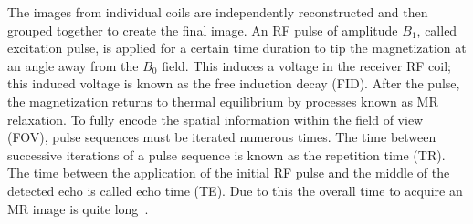 The images from individual coils are independently reconstructed and then grouped together to create the final image. An RF pulse of amplitude $B_1$, called excitation pulse, is applied for a certain time duration to tip the magnetization at an angle away from the $B_0$ field. This induces a voltage in the receiver RF coil; this induced voltage is known as the free induction decay (FID). After the pulse, the magnetization returns to thermal equilibrium by processes known as MR relaxation. To fully encode the spatial information within the field of view (FOV), pulse sequences must be iterated numerous times. The time between successive iterations of a pulse sequence is known as the repetition time (TR). The time between the application of the initial RF pulse and the middle of the detected echo is called echo time (TE). Due to this the overall time to acquire an MR image is quite long~\cite{Serai2021}.\\

